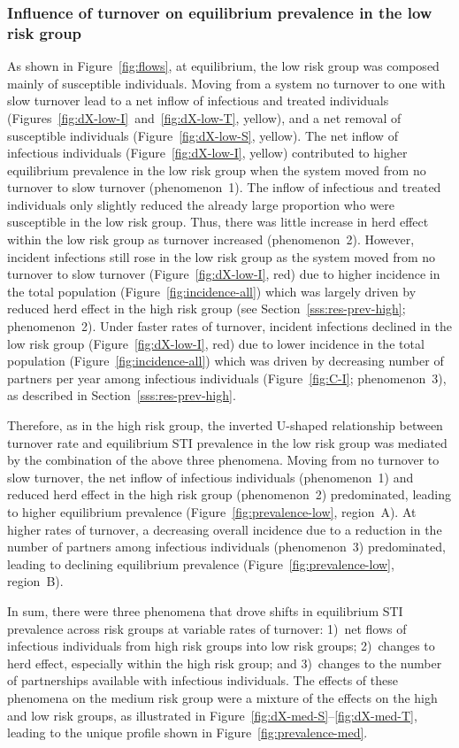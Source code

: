 \subsubsection{Influence of turnover on equilibrium prevalence in the low risk group}
\label{sss:res-prev-low}
As shown in Figure~\ref{fig:flows}, at equilibrium, the low risk group was
composed mainly of susceptible individuals.
Moving from a system no turnover to one with slow turnover
lead to a net inflow of infectious and treated individuals
(Figures~\ref{fig:dX-low-I}~and~\ref{fig:dX-low-T}, yellow),
and a net removal of susceptible individuals
(Figure~\ref{fig:dX-low-S}, yellow).
The net inflow of infectious individuals
(Figure~\ref{fig:dX-low-I}, yellow) contributed to
higher equilibrium prevalence in the low risk group
when the system moved from no turnover to slow turnover
(phenomenon~1).
The inflow of infectious and treated individuals
only slightly reduced the already large proportion who were susceptible
in the low risk group.
Thus, there was little increase in herd effect within the low risk group
as turnover increased
(phenomenon~2).
However, incident infections still rose in the low risk group
as the system moved from no turnover to slow turnover
(Figure~\ref{fig:dX-low-I}, red)
due to higher incidence in the total population (Figure~\ref{fig:incidence-all})
which was largely driven by
reduced herd effect in the high risk group
(see Section~\ref{sss:res-prev-high}; phenomenon~2).
Under faster rates of turnover,
incident infections declined in the low risk group
(Figure~\ref{fig:dX-low-I}, red)
due to lower incidence in the total population
(Figure~\ref{fig:incidence-all})
which was driven by
decreasing number of partners per year among infectious individuals
(Figure~\ref{fig:C-I}; phenomenon~3),
as described in Section~\ref{sss:res-prev-high}.
\par
Therefore, as in the high risk group,
the inverted U-shaped relationship between turnover rate
and equilibrium STI prevalence in the low risk group was mediated
by the combination of the above three phenomena.
Moving from no turnover to slow turnover,
the net inflow of infectious individuals (phenomenon~1)
and reduced herd effect in the high risk group (phenomenon~2)
predominated, leading to higher equilibrium prevalence
(Figure~\ref{fig:prevalence-low}, region~A).
At higher rates of turnover,
a decreasing overall incidence due to
a reduction in the number of partners among infectious individuals (phenomenon~3)
predominated, leading to declining equilibrium prevalence
(Figure~\ref{fig:prevalence-low}, region~B).
\par
In sum, there were three phenomena that
drove shifts in equilibrium STI prevalence across risk groups
at variable rates of turnover:
1)~net flows of infectious individuals from high risk groups into low risk groups;
2)~changes to herd effect, especially within the high risk group; and
3)~changes to the number of partnerships available with infectious individuals.
The effects of these phenomena on the medium risk group were
a mixture of the effects on the high and low risk groups,
as illustrated in Figure~\ref{fig:dX-med-S}--\ref{fig:dX-med-T},
leading to the unique profile shown in Figure~\ref{fig:prevalence-med}.

